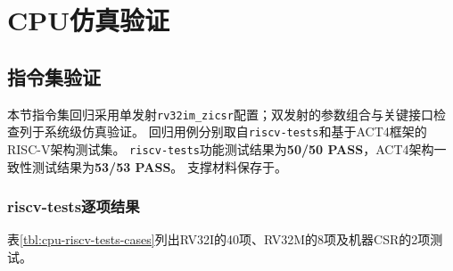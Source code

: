 \section{CPU仿真验证}

\subsection{指令集验证}

本节指令集回归采用单发射\texttt{rv32im\_zicsr}配置；双发射的参数组合与关键接口检查列于系统级仿真验证。
回归用例分别取自\texttt{riscv-tests}\cite{riscv-tests}和基于ACT4框架的RISC-V架构测试集\cite{riscv-act4}。
\texttt{riscv-tests}功能测试结果为\textbf{50/50 PASS}，ACT4架构一致性测试结果为\textbf{53/53 PASS}。
支撑材料保存于。

\subsubsection{riscv-tests逐项结果}
表\ref{tbl:cpu-riscv-tests-cases}列出RV32I的40项、RV32M的8项及机器CSR的2项测试。

